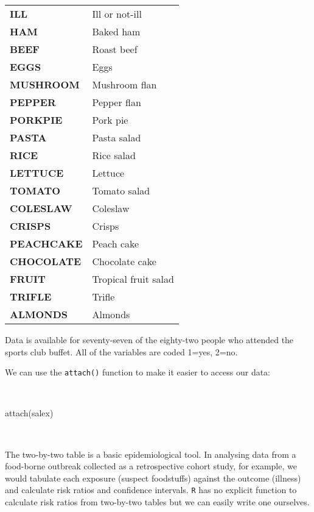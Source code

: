 \documentclass[
  12pt,
  a4paper]{book}
\newenvironment{Shaded}{\begin{snugshade}}{\end{snugshade}}
\newcommand{\FunctionTok}[1]{\textcolor[rgb]{0.00,0.00,0.00}{#1}}
\newcommand{\NormalTok}[1]{#1}
\begin{document}
\begin{longtable}[]{@{}
  >{\raggedright\arraybackslash}p{}
  >{\raggedright\arraybackslash}p{}@{}}
\toprule
\endhead
\textbf{ILL} & Ill or not-ill \\
\textbf{HAM} & Baked ham \\
\textbf{BEEF} & Roast beef \\
\textbf{EGGS} & Eggs \\
\textbf{MUSHROOM} & Mushroom flan \\
\textbf{PEPPER} & Pepper flan \\
\textbf{PORKPIE} & Pork pie \\
\textbf{PASTA} & Pasta salad \\
\textbf{RICE} & Rice salad \\
\textbf{LETTUCE} & Lettuce \\
\textbf{TOMATO} & Tomato salad \\
\textbf{COLESLAW} & Coleslaw \\
\textbf{CRISPS} & Crisps \\
\textbf{PEACHCAKE} & Peach cake \\
\textbf{CHOCOLATE} & Chocolate cake \\
\textbf{FRUIT} & Tropical fruit salad \\
\textbf{TRIFLE} & Trifle \\
\textbf{ALMONDS} & Almonds \\
\bottomrule
\end{longtable}

Data is available for seventy-seven of the eighty-two people who attended the sports club buffet. All of the variables are coded 1=yes, 2=no.

\newpage

We can use the \texttt{attach()} function to make it easier to access our data:

~

\begin{Shaded}
\begin{Highlighting}[]
\FunctionTok{attach}\NormalTok{(salex)}
\end{Highlighting}
\end{Shaded}

~

The two-by-two table is a basic epidemiological tool. In analysing data from a food-borne outbreak collected as a retrospective cohort study, for example, we would tabulate each exposure (suspect foodstuffs) against the outcome (illness) and calculate risk ratios and confidence intervals. \texttt{R} has no explicit function to calculate risk ratios from two-by-two tables but we can easily write one ourselves.
\end{document}
